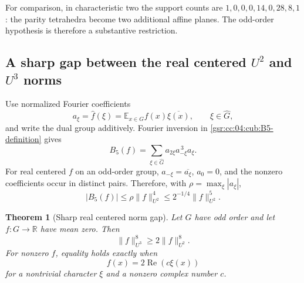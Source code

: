 \documentclass[11pt,letterpaper]{article}
\numberwithin{equation}{section}
\newtheorem{theorem}{Theorem}[section]
\theoremstyle{definition}
\theoremstyle{remark}
\newcommand{\1}{\mathbf 1}
\begin{document}
For comparison, in characteristic two the support counts are
$1,0,0,0,14,0,28,8,1$: the parity tetrahedra become two additional affine
planes. The odd-order hypothesis is therefore a substantive restriction.

\subsection{A sharp gap between the real centered \texorpdfstring{$U^2$ and $U^3$}{U2 and U3} norms}

Use normalized Fourier coefficients
\[
 a_\xi=\widehat f(\xi)
       =\mathbb E_{x\in G}f(x)\overline{\xi(x)},
 \qquad \xi\in\widehat G,
\]
and write the dual group additively. Fourier inversion in
\eqref{gsr:cc:04:cub:B5-definition} gives
\begin{equation}
 B_5(f)=\sum_{\xi\in\widehat G}a_{2\xi}a_{-\xi}^{\,3}a_\xi.
 \label{gsr:cc:04:cub:B5-fourier}
\end{equation}
For real centered $f$ on an odd-order group,
$a_{-\xi}=\overline{a_\xi}$, $a_0=0$, and the nonzero coefficients occur
in distinct pairs. Therefore, with $\rho=\max_\xi|a_\xi|$,
\begin{equation}
 |B_5(f)|\leq\rho\|f\|_{U^2}^4
             \leq2^{-1/4}\|f\|_{U^2}^5.
 \label{gsr:cc:04:cub:B5-bound}
\end{equation}

\begin{theorem}[Sharp real centered norm gap]
\label{gsr:cc:04:cub:norm-gap}
Let $G$ have odd order and let $f:G\to\mathbb R$ have mean zero. Then
\begin{equation}
        \|f\|_{U^3}^{8}\geq2\|f\|_{U^2}^{8}.
 \label{gsr:cc:04:cub:gap}
\end{equation}
For nonzero $f$, equality holds exactly when
\[
                   f(x)=2\operatorname{Re}(c\xi(x))
\]
for a nontrivial character $\xi$ and a nonzero complex number $c$.
\end{theorem}
\end{document}
